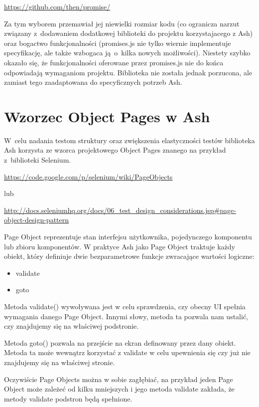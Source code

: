 \documentclass[brudnopis]{xmgr}
\begin{document}
\url{https://github.com/then/promise/}

Za tym wyborem przemawiał jej niewielki rozmiar kodu (co ogranicza narzut związany z~dodawaniem dodatkowej biblioteki do projektu korzystajacego z Ash) oraz bogactwo funkcjonalności (promises.js nie tylko wiernie implementuje specyfikację, ale także wzbogaca ją~o~kilka nowych możliwości). Niestety szybko okazało się, że funkcjonalności oferowane przez promises.js nie do końca odpowiadają wymaganiom projektu. Biblioteka nie została jednak porzucona, ale zamiast tego zaadaptowana do specyficznych potrzeb Ash.  

\section{Wzorzec Object Pages w Ash}

W~celu nadania testom struktury oraz zwiększenia elastyczności testów biblioteka Ash korzysta ze wzorca projektowego Object Pages znanego na przykład z~biblioteki Selenium. 

\url{https://code.google.com/p/selenium/wiki/PageObjects}

lub

\url{http://docs.seleniumhq.org/docs/06\_test\_design\_considerations.jsp\#page-object-design-pattern}

Page Object reprezentuje stan interfejsu użytkownika, pojedynczego komponentu lub zbioru komponentów. W praktyce Ash jako Page Object traktuje każdy obiekt, który definiuje dwie bezparametrowe funkcje zwracające wartości logiczne:

\begin{itemize}
  \item validate
  \item goto
\end{itemize}

Metoda validate() wywoływana jest w celu sprawdzenia, czy obecny UI spełnia wymagania danego Page Object. Innymi słowy, metoda ta pozwala nam ustalić, czy znajdujemy się na właściwej podstronie. 

Metoda goto() pozwala na przejście na ekran definowany przez dany obiekt. Metoda ta może wewnątrz korzystać z validate w celu upewnienia się czy już nie znajdujemy się na właściwej stronie. 

Oczywiście Page Objects można w sobie zagłębiać, na przykład jeden Page Object może zależeć od kilku mniejszych i jego metoda validate zakłada, że metody validate podstron będą spełnione. 
\end{document}
